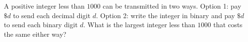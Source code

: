 A positive integer less than $1000$ can be transmitted in two ways. Option 1: pay $\$d$ to send each decimal digit $d$. Option 2: write the integer in binary and pay $\$d$ to send each binary digit $d$. What is the largest integer less than $1000$ that costs the same either way?
